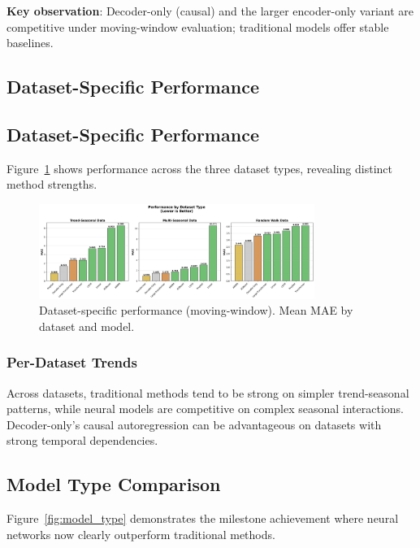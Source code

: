 \documentclass[11pt]{article}
\begin{document}
\textbf{Key observation}: Decoder-only (causal) and the larger encoder-only variant are competitive under moving-window evaluation; traditional models offer stable baselines.

\subsection{Dataset-Specific Performance}

\subsection{Dataset-Specific Performance}

Figure~\ref{fig:dataset_performance} shows performance across the three dataset types, revealing distinct method strengths.

\begin{figure}[h]
\centering
\includegraphics[width=0.8\textwidth]{../results/figure3_dataset_performance.png}
\caption{Dataset-specific performance (moving-window). Mean MAE by dataset and model.}
\label{fig:dataset_performance}
\end{figure}

\subsubsection{Per-Dataset Trends}
Across datasets, traditional methods tend to be strong on simpler trend-seasonal patterns, while neural models are competitive on complex seasonal interactions. Decoder-only's causal autoregression can be advantageous on datasets with strong temporal dependencies.

\subsection{Model Type Comparison}

Figure~\ref{fig:model_type} demonstrates the milestone achievement where neural networks now clearly outperform traditional methods.
\end{document}
